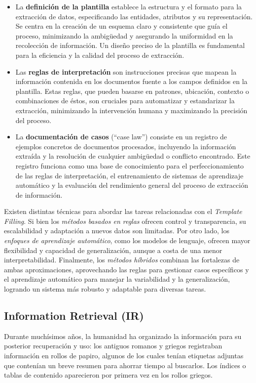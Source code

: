 \begin{itemize}
    \item La \textbf{definición de la plantilla} establece la estructura y el formato 
    para la extracción de datos, especificando las entidades, atributos y su representación. 
    Se centra en la creación de un esquema claro y consistente que guía el proceso, 
    minimizando la ambigüedad y asegurando la uniformidad en la recolección de información. 
    Un diseño preciso de la plantilla es fundamental para la eficiencia y la calidad del proceso de extracción.
    \item Las \textbf{reglas de interpretación} son instrucciones precisas que mapean 
    la información contenida en los documentos fuente a los campos definidos en la plantilla. 
    Estas reglas, que pueden basarse en patrones, ubicación, contexto o combinaciones de éstos, 
    son cruciales para automatizar y estandarizar la extracción, minimizando la intervención humana y 
    maximizando la precisión del proceso.
    \item La \textbf{documentación de casos} (``case law'') consiste en un registro de 
    ejemplos concretos de documentos procesados, incluyendo la información extraída y 
    la resolución de cualquier ambigüedad o conflicto encontrado. Este registro funciona 
    como una base de conocimiento para el perfeccionamiento de las reglas de interpretación, 
    el entrenamiento de sistemas de aprendizaje automático y la evaluación del rendimiento 
    general del proceso de extracción de información.
\end{itemize}

Existen distintas técnicas para abordar las tareas relacionadas con el \textit{Template Filling}. 
Si bien los \textit{métodos basados en reglas} ofrecen control y transparencia, 
su escalabilidad y adaptación a nuevos datos son limitadas. Por otro lado, 
los \textit{enfoques de aprendizaje automático}, como los modelos de lenguaje, 
ofrecen mayor flexibilidad y capacidad de generalización, aunque a costa de una 
menor interpretabilidad. Finalmente, los \textit{métodos híbridos} combinan 
las fortalezas de ambas aproximaciones, aprovechando las reglas para gestionar 
casos específicos y el aprendizaje automático para manejar la variabilidad y 
la generalización, logrando un sistema más robusto y adaptable para diversas tareas.


\subsection{Information Retrieval (IR)}
Durante muchísimos años, la humanidad ha organizado la información para su posterior 
recuperación y uso: los antiguos romanos y griegos registraban información en 
rollos de papiro, algunos de los cuales tenían etiquetas adjuntas que contenían un 
breve resumen para ahorrar tiempo al buscarlos. Los índices o tablas de contenido 
aparecieron por primera vez en los rollos griegos.

